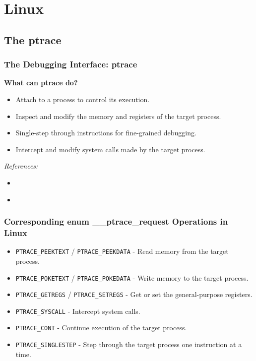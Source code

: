 \section{Linux}

\subsection{The ptrace}
\begin{frame}
    \frametitle{The Debugging Interface: ptrace}
    \textbf{What can ptrace do?}
    \begin{itemize}
        \item Attach to a process to control its execution.
        \item Inspect and modify the memory and registers of the target process.
        \item Single-step through instructions for fine-grained debugging.
        \item Intercept and modify system calls made by the target process.
    \end{itemize}
    \textit{References:}
    \begin{itemize}
        \item \cite{man7ptrace}
        \item \cite{hizakura2022}
    \end{itemize}
\end{frame}

\begin{frame}
    \frametitle{Corresponding enum \_\_ptrace\_request Operations in Linux}
    \begin{itemize}
        \item \texttt{PTRACE\_PEEKTEXT} / \texttt{PTRACE\_PEEKDATA} - Read memory from the target process.
        \item \texttt{PTRACE\_POKETEXT} / \texttt{PTRACE\_POKEDATA} - Write memory to the target process.
        \item \texttt{PTRACE\_GETREGS} / \texttt{PTRACE\_SETREGS} - Get or set the general-purpose registers.
        \item \texttt{PTRACE\_SYSCALL} - Intercept system calls.
        \item \texttt{PTRACE\_CONT} - Continue execution of the target process.
        \item \texttt{PTRACE\_SINGLESTEP} - Step through the target process one instruction at a time.
    \end{itemize}
\end{frame}

